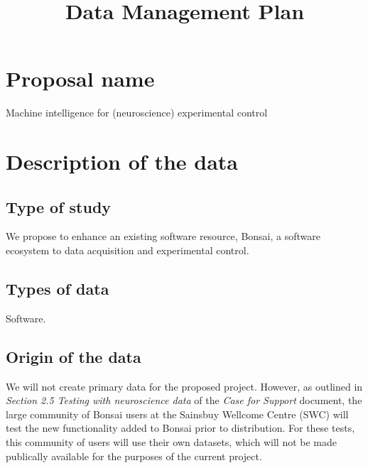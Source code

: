 \documentclass[a4paper,11pt]{article}
\title{Data Management Plan}
\author{}
\date{}
\begin{document}
\maketitle

\setcounter{section}{-1}

\section{Proposal name}
Machine intelligence for (neuroscience) experimental control

\section{Description of the data}
\subsection{Type of study}

We propose to enhance an existing software resource, Bonsai, a software
ecosystem to data acquisition and experimental control.

\subsection{Types of data}

Software.

\subsection{Origin of the data}

We will not create primary data for the proposed project. However, as outlined
in \emph{Section 2.5 Testing with neuroscience data} of the \emph{Case for
Support} document, the large community of Bonsai users at the Sainsbuy Wellcome
Centre (SWC) will test the new functionality added to Bonsai prior to
distribution. For these tests, this community of users will use their own
datasets, which will not be made publically available for the purposes of the
current project.
\end{document}
